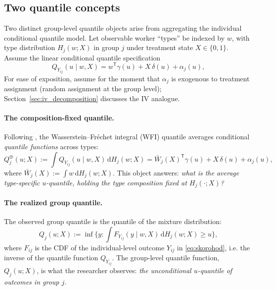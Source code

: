 \documentclass[12pt]{article}
\newcommand{\T}{\mathsf{T}} %
\newcommand{\dd}{\mathrm{d}} %
\begin{document}
\subsection{Two quantile concepts}

Two distinct group-level quantile objects arise from aggregating the individual conditional quantile model. Let observable worker ``types'' be indexed by $w$, with type distribution $H_j(w;X)$ in group $j$ under treatment state $X\in\{0,1\}$. Assume the linear conditional quantile specification
\begin{equation}\label{eq:indiv_q}
Q_{Y_{ij}}(u\mid w,X)=w^{\T}\gamma(u)+X\,\delta(u)+\alpha_j(u),
\end{equation}
For ease of exposition, assume for the moment that $\alpha_j$ is exogenous to treatment assignment (random assignment at the group level); Section~\ref{sec:iv_decomposition} discusses the IV analogue.

\paragraph{The composition-fixed quantile.}
Following \citet{petersen2021wasserstein}, the Wasserstein--Fr\'echet integral (WFI) quantile averages conditional \emph{quantile functions} across types:
\begin{equation}\label{eq:wfi_new3}
Q_j^{\oplus}(u;X)
:=\int Q_{Y_{ij}}(u\mid w,X)\,\dd H_j(w;X)
=\bar W_j(X)^{\T}\gamma(u)+X\,\delta(u)+\alpha_j(u),
\end{equation}
where $\bar W_j(X):=\int w\,\dd H_j(w;X)$. This object answers: \emph{what is the average type-specific $u$-quantile, holding the type composition fixed at $H_j(\cdot;X)$?}

\paragraph{The realized group quantile.}
The observed group quantile is the quantile of the mixture distribution:
\begin{equation}\label{eq:group_new3}
Q_j(u;X)
:=\inf\Big\{y:\int F_{Y_{ij}}(y\mid w,X)\,\dd H_j(w;X)\ge u\Big\},
\end{equation}
where $F_{ij}$ is the CDF of the individual-level outcome $Y_{ij}$ in \eqref{eq:skorohod}, i.e. the inverse of the quantile function $Q_{Y_{ij}}$. The group-level quantile function, $Q_j(u; X)$, is what the researcher observes: \emph{the unconditional $u$-quantile of outcomes in group $j$.}
\end{document}

